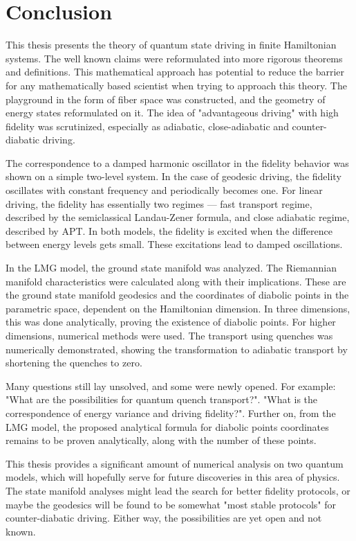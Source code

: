 \chapter*{Conclusion}
This thesis presents the theory of quantum state driving in finite Hamiltonian systems. The well known claims were reformulated into more rigorous theorems and definitions. This mathematical approach has potential to reduce the barrier for any mathematically based scientist when trying to approach this theory. The playground in the form of fiber space was constructed, and the geometry of energy states reformulated on it. The idea of "advantageous driving" with high fidelity was scrutinized, especially as adiabatic, close-adiabatic and counter-diabatic driving.

The correspondence to a damped harmonic oscillator in the fidelity behavior was shown on a simple two-level system. In the case of geodesic driving, the fidelity oscillates with constant frequency and periodically becomes one. For linear driving, the fidelity has essentially two regimes — fast transport regime, described by the semiclassical Landau-Zener formula, and close adiabatic regime, described by APT. In both models, the fidelity is excited when the difference between energy levels gets small. These excitations lead to damped oscillations.

In the LMG model, the ground state manifold was analyzed. The Riemannian manifold characteristics were calculated along with their implications. These are the ground state manifold geodesics and the coordinates of diabolic points in the parametric space, dependent on the Hamiltonian dimension. In three dimensions, this was done analytically, proving the existence of diabolic points. For higher dimensions, numerical methods were used. The transport using quenches was numerically demonstrated, showing the transformation to adiabatic transport by shortening the quenches to zero.

Many questions still lay unsolved, and some were newly opened. For example: "What are the possibilities for quantum quench transport?". "What is the correspondence of energy variance and driving fidelity?". Further on, from the LMG model, the proposed analytical formula for diabolic points coordinates remains to be proven analytically, along with the number of these points.

This thesis provides a significant amount of numerical analysis on two quantum models, which will hopefully serve for future discoveries in this area of physics. The state manifold analyses might lead the search for better fidelity protocols, or maybe the geodesics will be found to be somewhat "most stable protocols" for counter-diabatic driving. Either way, the possibilities are yet open and not known.